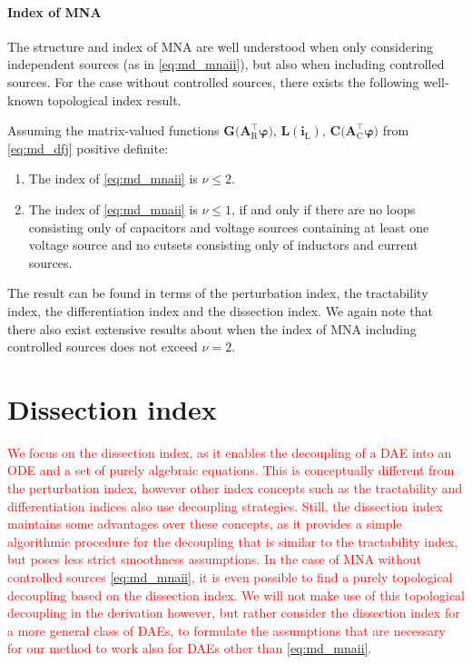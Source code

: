 \documentclass[AMA,STIX1COL]{WileyNJD-v2}
\newcommand{\mb}[1]{\mathbf{#1}}
\newcommand{\mr}[1]{\mathrm{#1}}
\newcommand{\T}{{\!\top}}
\newcommand{\AT}[1]{\mb{A}_\mr{#1}^{\T}}
\newcommand{\vphi}{\boldsymbol{\varphi}}
\renewcommand{\i}[1]{\mb{i}_\mr{#1}}
\begin{document}
\paragraph{Index of MNA}
The structure and index of MNA are well understood when only considering independent sources\cite{tischendorf1999} (as in \eqref{eq:md_mnaii}), but also when including controlled sources\cite{estevez2000ijcta}. For the case without controlled sources, there exists the following well-known topological index result.
\begin{theorem}
    \label{th:ic_imna}
    Assuming the matrix-valued functions $\mb{G} \big( \AT{R} \vphi \big)$, $\mb{L}(\i{L})$, $\mb{C} \big( \AT{C} \vphi \big)$ from \eqref{eq:md_dfj} positive definite:
    \begin{enumerate}
        \item The index of \eqref{eq:md_mnaii} is $\nu \leq 2$.
        \item The index of \eqref{eq:md_mnaii} is $\nu \leq 1$, if and only if there are no loops consisting only of capacitors and voltage sources containing at least one voltage source and no cutsets consisting only of inductors and current sources.
    \end{enumerate}
\end{theorem}
The result can be found in terms of the perturbation index\cite{gunther1996}, the tractability index\cite{tischendorf1999}, the differentiation index\cite{estevez2000ijcta} and the dissection index\cite{jansen2014}. We again note that there also exist extensive results about when the index of MNA including controlled sources does not exceed $\nu = 2$\cite{estevez2000ijcta}.

\section{Dissection index}
\label{sec:di}
\textcolor{red}{We focus on the dissection index, as it enables the decoupling of a DAE into an ODE and a set of purely algebraic equations. This is conceptually different from the perturbation index, however other index concepts such as the tractability and differentiation indices also use decoupling strategies. Still, the dissection index maintains some advantages over these concepts, as it provides a simple algorithmic procedure for the decoupling that is similar to the tractability index, but poses less strict smoothness assumptions. In the case of MNA without controlled sources \eqref{eq:md_mnaii}, it is even possible to find a purely topological decoupling based on the dissection index\cite{jansen2014}. We will not make use of this topological decoupling in the derivation however, but rather consider the dissection index for a more general class of DAEs, to formulate the assumptions that are necessary for our method to work also for DAEs other than \eqref{eq:md_mnaii}.}
\end{document}
